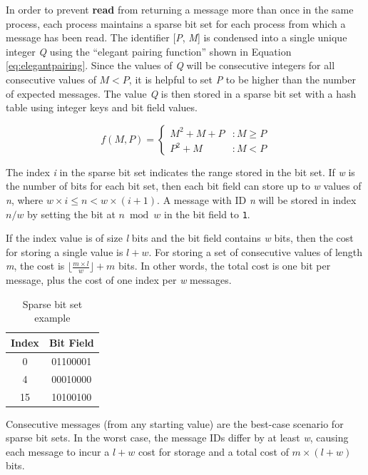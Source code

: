 In order to prevent \textbf{read} from returning a message more than once in the same process, each process maintains a sparse bit set for each process from which a message has been read. The identifier [\textit{P}, \textit{M}] is condensed into a single unique integer \textit{Q} using the ``elegant pairing function''\cite{szudzikelegant} shown in Equation \ref{eq:elegantpairing}. Since the values of \textit{Q} will be consecutive integers for all consecutive values of $M < P$, it is helpful to set \textit{P} to be higher than the number of expected messages. The value \textit{Q} is then stored in a sparse bit set with a hash table using integer keys and bit field values.

 \begin{equation}
   f(M,P) = \left\{
     \begin{array}{lr}
       M^{2} + M + P & : M \geq P \\
       P^{2} + M & : M < P
     \end{array}
   \right.
   \label{eq:elegantpairing}
\end{equation}

The index \textit{i} in the sparse bit set indicates the range stored in the bit set. If \textit{w} is the number of bits for each bit set, then each bit field can store up to \textit{w} values of \textit{n}, where $w \times i \leq n < w \times (i + 1)$. A message with ID \textit{n} will be stored in index $n/w$ by setting the bit at $n \bmod w$ in the bit field to \texttt{1}.

If the index value is of size \textit{l} bits and the bit field contains \textit{w} bits, then the cost for storing a single value is $l + w$. For storing a set of consecutive values of length \textit{m}, the cost is $\lfloor \frac{m \times l}{w} \rfloor + m$ bits. In other words, the total cost is one bit per message, plus the cost of one index per \textit{w} messages.

\begin{table}
\centering
\caption{Sparse bit set example}
\begin{tabular}{|c|c|} \hline
Index & Bit Field \\ \hline
0 & 01100001 \\ \hline
4 & 00010000 \\ \hline
15 & 10100100 \\ \hline
\end{tabular}
\label{fig:bitset}
\end{table}

Consecutive messages (from any starting value) are the best-case scenario for sparse bit sets. In the worst case, the message IDs differ by at least \textit{w}, causing each message to incur a $l + w$ cost for storage and a total cost of $m \times (l + w)$ bits.


